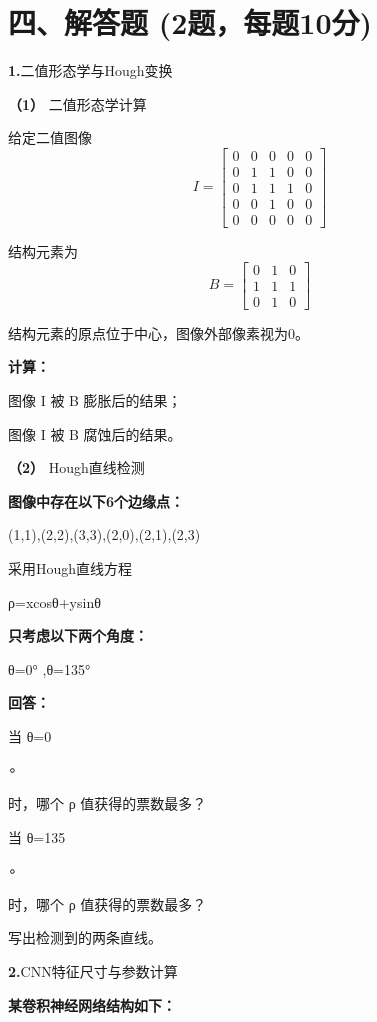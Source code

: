 \documentclass[UTF8,openany,oneside,zihao=-4,fontset=windows]{ctexbook}
\newif\ifshowsolutions
\newcommand{\Question}[2]{%
  \par\Needspace{4\baselineskip}\medskip
  \noindent\textbf{\color{MVBlue}#1}\quad #2\par
}
\newcommand{\PracticeSpace}[1]{\ifshowsolutions\else\par\vspace{#1}\par\fi}
\begin{document}
\section{四、解答题 (2题，每题10分)}
\Question{1.}{二值形态学与Hough变换}
\par\noindent\textbf{（1）} 二值形态学计算
\par 给定二值图像
\[
I = \begin{bmatrix}
0 & 0 & 0 & 0 & 0 \\
0 & 1 & 1 & 0 & 0 \\
0 & 1 & 1 & 1 & 0 \\
0 & 0 & 1 & 0 & 0 \\
0 & 0 & 0 & 0 & 0
\end{bmatrix}
\]
\par 结构元素为
\[
B = \begin{bmatrix}
0 & 1 & 0 \\
1 & 1 & 1 \\
0 & 1 & 0
\end{bmatrix}
\]
\par 结构元素的原点位于中心，图像外部像素视为0。
\par\noindent\textbf{计算：}
\par\noindent\textbullet\quad 图像 I 被 B 膨胀后的结果；
\par 图像 I 被 B 腐蚀后的结果。
\par\noindent\textbf{（2）} Hough直线检测
\par\noindent\textbf{图像中存在以下6个边缘点：}
\par (1,1),(2,2),(3,3),(2,0),(2,1),(2,3)
\par 采用Hough直线方程
\par ρ=xcosθ+ysinθ
\par\noindent\textbf{只考虑以下两个角度：}
\begin{center}\small\ttfamily θ=0° ,θ=135°\end{center}
\par\noindent\textbf{回答：}
\par 当 θ=0
\par ∘
\par 时，哪个 ρ 值获得的票数最多？
\par 当 θ=135
\par ∘
\par 时，哪个 ρ 值获得的票数最多？
\par 写出检测到的两条直线。
\PracticeSpace{4.2cm}
\Question{2.}{CNN特征尺寸与参数计算}
\par\noindent\textbf{某卷积神经网络结构如下：}
\end{document}
